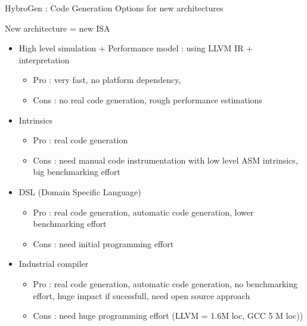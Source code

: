 \begin{Frame}{HybroGen : Code Generation Options for new architectures}
  \begin{block}{New architecture = new ISA}
    \begin{itemize}
    \item High level simulation + Performance model : using LLVM IR
      + interpretation
      \begin{itemize}
      \item Pro : very fast, no platform dependency, 
      \item Cons : no real code generation, rough performance estimations
      \end{itemize}
    \item Intrinsics
      \begin{itemize}
      \item Pro : real code generation
      \item Cons : need manual code instrumentation with low level
        ASM intrinsics, big benchmarking effort
      \end{itemize}
    \item DSL (Domain Specific Language)
      \begin{itemize}
      \item Pro : real code generation, automatic code generation,
        lower benchmarking effort
      \item Cons : need initial programming effort
      \end{itemize}
    \item Industrial compiler
      \begin{itemize}
      \item Pro : real code generation, automatic code generation, no
        benchmarking effort, huge impact if sucessfull, need open
        source approach
      \item Cons : need huge programming effort (LLVM = 1.6M loc, GCC
        5 M loc))
      \end{itemize}
    \end{itemize}
  \end{block}
\end{Frame}
